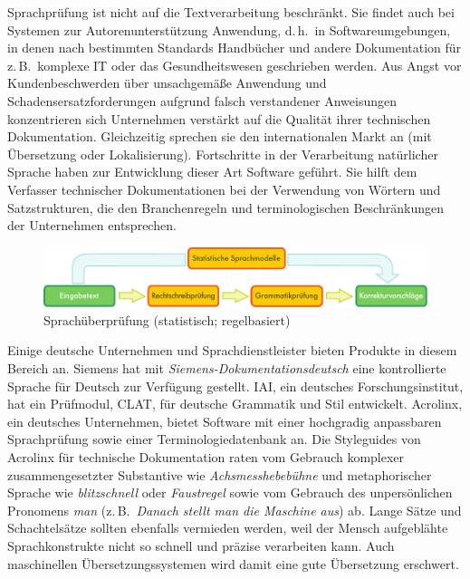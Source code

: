 \documentclass[]{../../metanetpaper}
\begin{document}
\begin{multicols}{2}

Sprachprüfung ist nicht auf die Textverarbeitung beschränkt. Sie findet auch bei Systemen zur Autorenunterstützung Anwendung, d.\,h.~in Softwareumgebungen, in denen nach bestimmten Standards Handbücher und andere Dokumentation für z.\,B.~komplexe IT oder das Gesundheitswesen geschrieben werden. Aus Angst vor Kundenbeschwerden über unsachgemäße Anwendung und Schadensersatzforderungen aufgrund falsch verstandener Anweisungen konzentrieren sich Unternehmen verstärkt auf die Qualität ihrer technischen Dokumentation. Gleichzeitig sprechen sie den internationalen Markt an (mit Übersetzung oder Lokalisierung). Fortschritte in der Verarbeitung natürlicher Sprache haben zur Entwicklung dieser Art Software geführt. Sie hilft dem Verfasser technischer Dokumentationen bei der Verwendung von Wörtern und Satzstrukturen, die den Branchenregeln und terminologischen Beschränkungen der Unternehmen entsprechen.

\begin{figure}[htb]
  \vspace{-9mm}
  \center
  \includegraphics[width=\textwidth]{../_media/german/language_checking}
  \caption{Sprachüberprüfung (statistisch; regelbasiert)}
  \label{fig:langcheckingaarch_de}
\end{figure}

Einige deutsche Unternehmen und Sprachdienstleister bieten Produkte in diesem Bereich an. Siemens hat mit \textit{Siemens-Dokumentationsdeutsch} eine kontrollierte Sprache für Deutsch zur Verfügung gestellt. IAI, ein deutsches Forschungsinstitut, hat ein Prüfmodul, CLAT, für deutsche Grammatik und Stil entwickelt. Acrolinx, ein deutsches Unternehmen, bietet Software mit einer hochgradig anpassbaren Sprachprüfung sowie einer Terminologiedatenbank an. Die Styleguides von Acrolinx für technische Dokumentation raten vom Gebrauch komplexer zusammengesetzter Substantive wie \textit{Achsmesshebebühne} und metaphorischer Sprache wie \textit{blitzschnell} oder \textit{Faustregel} sowie vom Gebrauch des unpersönlichen Pronomens \textit{man} (z.\,B.~\textit{Danach stellt man die Maschine aus}) ab. Lange Sätze und Schachtelsätze sollten ebenfalls vermieden werden, weil der Mensch aufgeblähte Sprachkonstrukte nicht so schnell und präzise verarbeiten kann. Auch maschinellen Übersetzungssystemen wird damit eine gute Übersetzung erschwert.


\end{multicols}
\end{document}
